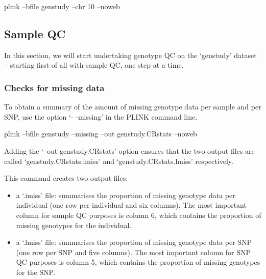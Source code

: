 \documentclass[]{book}
\newenvironment{Shaded}{\begin{snugshade}}{\end{snugshade}}
\newcommand{\ExtensionTok}[1]{#1}
\newcommand{\NormalTok}[1]{#1}
\providecommand{\tightlist}{%
  \setlength{\itemsep}{0pt}\setlength{\parskip}{0pt}}
\begin{document}
\begin{Shaded}
\begin{Highlighting}[]
\ExtensionTok{plink}\NormalTok{ --bfile genstudy --chr 10 --noweb}
\end{Highlighting}
\end{Shaded}

\subsection{Sample QC}\label{sample-qc}

In this section, we will start undertaking genotype QC on the `genstudy'
dataset -- starting first of all with sample QC, one step at a time.

\subsubsection{Checks for missing data}\label{checks-for-missing-data}

To obtain a summary of the amount of missing genotype data per sample
and per SNP, use the option `- -missing' in the PLINK command line.

\begin{Shaded}
\begin{Highlighting}[]
\ExtensionTok{plink}\NormalTok{ --bfile genstudy --missing --out genstudy.CRstats --noweb}
\end{Highlighting}
\end{Shaded}

Adding the `--out genstudy.CRstats' option ensures that the two output
files are called `genstudy.CRstats.imiss' and `genstudy.CRstats.lmiss'
respectively.

This command creates two output files:

\begin{itemize}
\tightlist
\item
  a `.imiss' file: summarises the proportion of missing genotype data
  per individual (one row per individual and six columns). The most
  important column for sample QC purposes is column 6, which contains
  the proportion of missing genotypes for the individual.
\item
  a `.lmiss' file: summarises the proportion of missing genotype data
  per SNP (one row per SNP and five columns). The most important column
  for SNP QC purposes is column 5, which contains the proportion of
  missing genotypes for the SNP.
\end{itemize}
\end{document}
